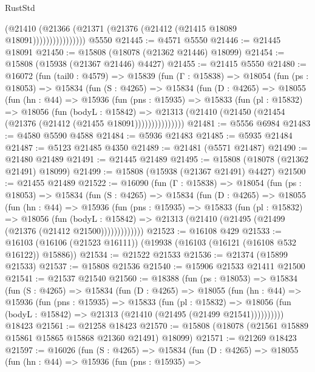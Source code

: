 \begin{lexlean}{RustStd}
\begin{coremodule}
                        (@21410
                          (@21366 (@21371 (@21376 (@21412 (@21415 @18089 @18091))))))))))))))))
    @5550
@21445 := @4571 @5550
@21446 := @21445 @18091
@21450 := @15808 (@18078 (@21362 @21446) @18099)
@21454 := @15808 (@15938 (@21367 @21446) @4427)
@21455 := @21415 @5550
@21480 := @16072
    (fun (tail0 : @4579) =>
    @15839
      (fun (Γ : @15838) =>
      @18054
        (fun (ps : @18053) =>
        @15834
          (fun (S : @4265) =>
          @15834
            (fun (D : @4265) =>
            @18055
              (fun (hn : @44) =>
              @15936
                (fun (pns : @15935) =>
                @15833
                  (fun (pl : @15832) =>
                  @18056
                    (fun (bodyL : @15842) =>
                    @21313 (@21410 (@21450 (@21454 (@21376 (@21412 (@21455 @18091)))))))))))))))
@21481 := @5556 @6984
@21483 := @4580 @5590 @4588
@21484 := @5936 @21483
@21485 := @5935 @21484
@21487 := @5123 @21485 @4350
@21489 := @21481 (@5571 @21487)
@21490 := @21480 @21489
@21491 := @21445 @21489
@21495 := @15808 (@18078 (@21362 @21491) @18099)
@21499 := @15808 (@15938 (@21367 @21491) @4427)
@21500 := @21455 @21489
@21522 := @16090
    (fun (Γ : @15838) =>
    @18054
      (fun (ps : @18053) =>
      @15834
        (fun (S : @4265) =>
        @15834
          (fun (D : @4265) =>
          @18055
            (fun (hn : @44) =>
            @15936
              (fun (pns : @15935) =>
              @15833
                (fun (pl : @15832) =>
                @18056
                  (fun (bodyL : @15842) =>
                  @21313 (@21410 (@21495 (@21499 (@21376 (@21412 @21500)))))))))))))
@21523 := @16108 @429
@21533 := @16103 (@16106 (@21523 @16111)) (@19938 (@16103 (@16121 (@16108 @532 @16122)) @15886))
@21534 := @21522 @21533
@21536 := @21374 (@15899 @21533)
@21537 := @15808 @21536
@21540 := @15906 @21533 @21411 @21500
@21541 := @21537 @21540
@21560 := @18388
    (fun (ps : @18053) =>
    @15834
      (fun (S : @4265) =>
      @15834
        (fun (D : @4265) =>
        @18055
          (fun (hn : @44) =>
          @15936
            (fun (pns : @15935) =>
            @15833
              (fun (pl : @15832) =>
              @18056 (fun (bodyL : @15842) => @21313 (@21410 (@21495 (@21499 @21541))))))))))
    @18423
@21561 := @21258 @18423
@21570 := @15808 (@18078 (@21561 @15889 @15861 @15865 @15868 @21360 @21491) @18099)
@21571 := @21269 @18423
@21597 := @16026
    (fun (S : @4265) =>
    @15834
      (fun (D : @4265) =>
      @18055
        (fun (hn : @44) =>
        @15936
          (fun (pns : @15935) =>

\end{coremodule}
\end{lexlean}
